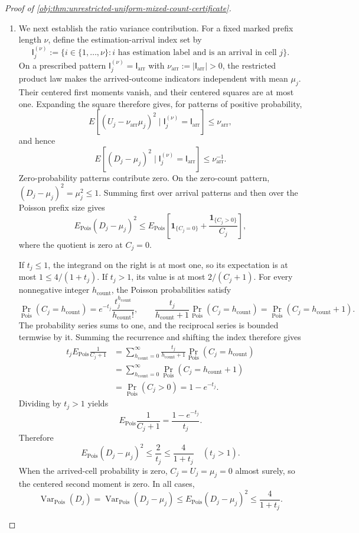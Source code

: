 \documentclass[11pt]{article}
\begin{document}
\begin{proof}[Proof of \cref{obj:thm:unrestricted-uniform-mixed-count-certificate}]
\begin{enumerate}
\item We next establish the ratio variance contribution.
For a fixed marked prefix length \(\nu\), define the estimation-arrival
index set by
\[
\mathsf I_j^{(\nu)}
:=
\{i\in\{1,\ldots,\nu\}:
i\text{ has estimation label and is an arrival in cell }j\}.
\]
On a prescribed pattern \(\mathsf I_j^{(\nu)}=\mathsf I_{\mathrm{arr}}\) with
\(\nu_{\mathrm{arr}}:=|\mathsf I_{\mathrm{arr}}|>0\), the restricted product law makes the
arrived-outcome indicators independent with mean \(\mu_j\). Their centered
first moments vanish, and their centered squares are at most one.
Expanding the square therefore gives, for patterns of positive
probability,
\[
E\!\left[
(U_j-\nu_{\mathrm{arr}}\mu_j)^2
\mid\mathsf I_j^{(\nu)}=\mathsf I_{\mathrm{arr}}
\right]\le\nu_{\mathrm{arr}},
\]
and hence
\[
E\!\left[
(D_j-\mu_j)^2
\mid\mathsf I_j^{(\nu)}=\mathsf I_{\mathrm{arr}}
\right]\le\nu_{\mathrm{arr}}^{-1}.
\]
Zero-probability patterns contribute zero. On the zero-count pattern,
\((D_j-\mu_j)^2=\mu_j^2\le1\). Summing first over arrival patterns and then
over the Poisson prefix size gives
\[
E_{\mathrm{Pois}}(D_j-\mu_j)^2
\le
E_{\mathrm{Pois}}\!\left[
\mathbf1_{\{C_j=0\}}
+\frac{\mathbf1_{\{C_j>0\}}}{C_j}
\right],
\]
where the quotient is zero at \(C_j=0\).

If \(t_j\le1\), the integrand on the right is at most one, so its expectation
is at most \(1\le4/(1+t_j)\). If \(t_j>1\), its value is at most
\(2/(C_j+1)\). For every nonnegative integer \(h_{\mathrm{count}}\), the Poisson probabilities satisfy
\[
\Pr_{\mathrm{Pois}}(C_j=h_{\mathrm{count}})
=e^{-t_j}\frac{t_j^{h_{\mathrm{count}}}}{h_{\mathrm{count}}!},
\qquad
\frac{t_j}{h_{\mathrm{count}}+1}
\Pr_{\mathrm{Pois}}(C_j=h_{\mathrm{count}})
=
\Pr_{\mathrm{Pois}}(C_j=h_{\mathrm{count}}+1).
\]
The probability series sums to one, and the reciprocal series is bounded termwise by it. Summing the recurrence and shifting the index therefore gives
\[
\begin{aligned}
t_jE_{\mathrm{Pois}}\frac1{C_j+1}
&=
\sum_{h_{\mathrm{count}}=0}^{\infty}
\frac{t_j}{h_{\mathrm{count}}+1}
\Pr_{\mathrm{Pois}}(C_j=h_{\mathrm{count}})\\
&=
\sum_{h_{\mathrm{count}}=0}^{\infty}
\Pr_{\mathrm{Pois}}(C_j=h_{\mathrm{count}}+1)\\
&=\Pr_{\mathrm{Pois}}(C_j>0)
=1-e^{-t_j}.
\end{aligned}
\]
Dividing by \(t_j>1\) yields
\[
E_{\mathrm{Pois}}\frac1{C_j+1}
=\frac{1-e^{-t_j}}{t_j}.
\]
Therefore
\[
E_{\mathrm{Pois}}(D_j-\mu_j)^2
\le\frac2{t_j}\le\frac4{1+t_j}
\quad(t_j>1).
\]
When the arrived-cell probability is zero, \(C_j=U_j=\mu_j=0\)
almost surely, so the centered second moment is zero. In all cases,
\[
\operatorname{Var}_{\mathrm{Pois}}(D_j)
=
\operatorname{Var}_{\mathrm{Pois}}(D_j-\mu_j)
\le E_{\mathrm{Pois}}(D_j-\mu_j)^2
\le\frac4{1+t_j}.
\]


\end{enumerate}
\end{proof}
\end{document}
